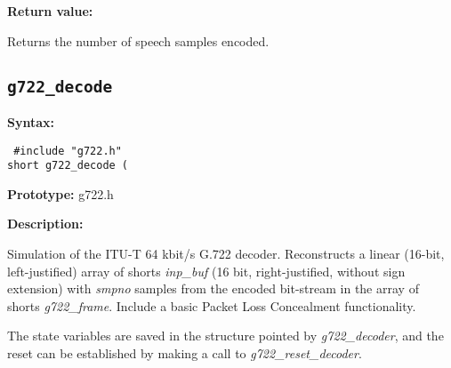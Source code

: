         {\bf Return value: }

Returns the number of speech samples encoded.


\newpage
\subsection{{\tt g722\_decode}}

{\bf Syntax: }

{\tt
\#include "g722.h"\\
short g722\_decode (
}

{\bf Prototype: }    g722.h

\enlargethispage*{12mm}
{\bf Description: }

        Simulation of the ITU-T 64 kbit/s G.722 decoder. Reconstructs
        a linear (16-bit, left-justified) array
        of shorts {\em inp\_buf} (16 bit,
        right-justified, without sign extension) with {\em smpno}
        samples from the encoded bit-stream in the array of shorts
        {\em g722\_frame}. Include a basic Packet Loss Concealment functionality.

        The state variables are saved in the structure pointed by {\em
        g722\_decoder}, and the reset can be established by making a
        call to {\em g722\_reset\_decoder}.

